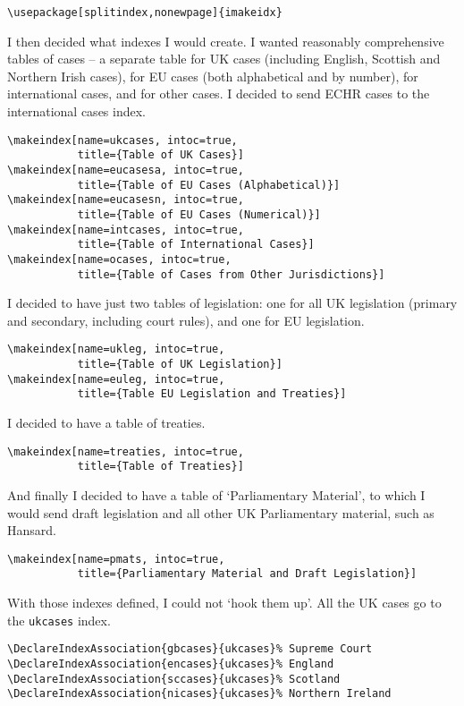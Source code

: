\documentclass[a4paper,
               11pt,
	       DIV=1,			   
	       footinclude=false]
	      {scrartcl}
\begin{document}
\begin{verbatim}
\usepackage[splitindex,nonewpage]{imakeidx}
\end{verbatim}

I then decided what indexes I would create. I wanted reasonably comprehensive tables of cases -- a separate table for UK cases (including English, Scottish and Northern Irish cases), for EU cases (both alphabetical and by number), for international cases, and for other cases. I decided to send ECHR cases to the international cases index.

\begin{verbatim}
\makeindex[name=ukcases, intoc=true,
           title={Table of UK Cases}]
\makeindex[name=eucasesa, intoc=true,
           title={Table of EU Cases (Alphabetical)}]
\makeindex[name=eucasesn, intoc=true,
           title={Table of EU Cases (Numerical)}]
\makeindex[name=intcases, intoc=true,
           title={Table of International Cases}]
\makeindex[name=ocases, intoc=true,
           title={Table of Cases from Other Jurisdictions}]
\end{verbatim}

I decided to have just two tables of legislation: one for all UK legislation (primary and secondary, including court rules), and one for EU legislation.

\begin{verbatim}
\makeindex[name=ukleg, intoc=true,
           title={Table of UK Legislation}]
\makeindex[name=euleg, intoc=true,
           title={Table EU Legislation and Treaties}]
\end{verbatim}

I decided to have a table of treaties.
\begin{verbatim}
\makeindex[name=treaties, intoc=true,
           title={Table of Treaties}]
\end{verbatim}

And finally I decided to have a table of `Parliamentary Material', to which I would send draft legislation and all other UK Parliamentary material, such as Hansard.

\begin{verbatim}
\makeindex[name=pmats, intoc=true,
           title={Parliamentary Material and Draft Legislation}]
\end{verbatim}

With those indexes defined, I could not `hook them up'. All the UK cases go to the \texttt{ukcases} index.
\begin{verbatim}
\DeclareIndexAssociation{gbcases}{ukcases}% Supreme Court
\DeclareIndexAssociation{encases}{ukcases}% England
\DeclareIndexAssociation{sccases}{ukcases}% Scotland
\DeclareIndexAssociation{nicases}{ukcases}% Northern Ireland
\end{verbatim}
\end{document}
